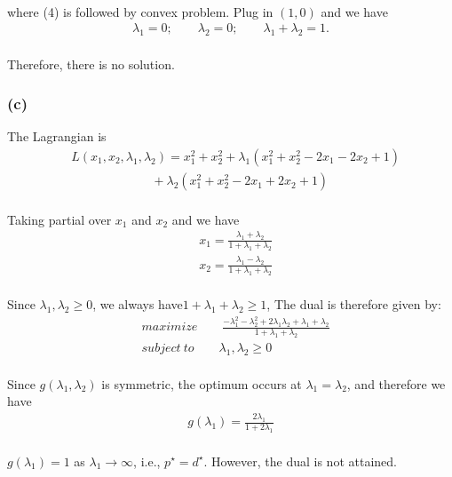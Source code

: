 \paragraph{}
where (4) is followed by convex problem. Plug in $(1, 0)$ and we have
\begin{align*}
\lambda_1 = 0; \qquad \lambda_2 = 0;\qquad \lambda_1 +\lambda_2 = 1.
\end{align*}
\paragraph{}
Therefore, there is no solution.
\subsubsection*{(c)}
The Lagrangian is
\begin{align*}
&L(x_1, x_2, \lambda_1, \lambda_2) =x_1^2 +x_2^2 +\lambda_1(x_1^2 +x_2^2 -2x_1 -2x_2 +1)\\
&\qquad \qquad \qquad \ \ + \lambda_2(x_1^2 +x_2^2 -2x_1 +2x_2 +1)
\end{align*}
\paragraph{}
Taking partial over $x_1$ and $x_2$ and we have
\begin{align*}
&x_1 = \frac{\lambda_1 +\lambda_2}{1+\lambda_1+\lambda_2}\\
&x_2 = \frac{\lambda_1 -\lambda_2}{1+\lambda_1+\lambda_2}
\end{align*}
\paragraph{}
Since $\lambda_1, \lambda_2 \geq 0$, we always have$1+\lambda_1+\lambda_2 \geq 1$, The dual is therefore given by:
\begin{align*}
&maximize \qquad \frac{-\lambda_1^2 -\lambda_2^2+2\lambda_1 \lambda_2+\lambda_1+\lambda_2}{1+\lambda_1+\lambda_2}\\
&subject\ to \qquad \lambda_1, \lambda_2 \geq 0
\end{align*}
\paragraph{}
Since $g(\lambda_1,\lambda_2)$ is symmetric, the optimum occurs at $\lambda_1 =\lambda_2$, and therefore we have
\begin{align*}
g(\lambda_1) = \frac{2\lambda_1}{1+2\lambda_1}
\end{align*}
\paragraph{}
$g(\lambda_1) = 1$ as $\lambda_1 \rightarrow \infty$, i.e., $p^\star = d^\star$. However, the dual is not attained. 